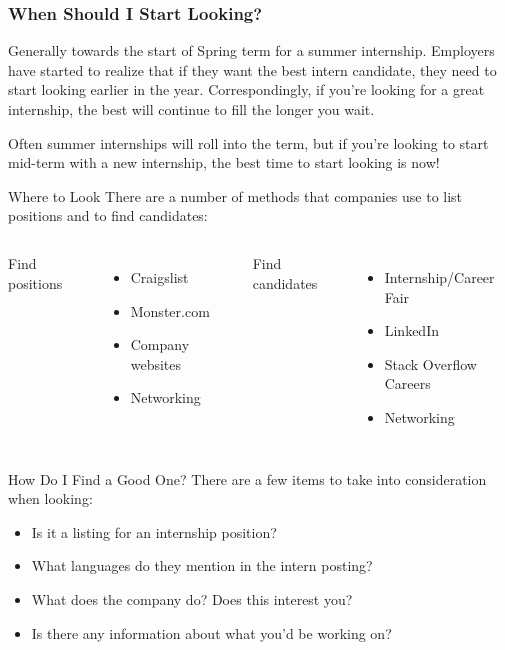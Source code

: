 \documentclass{beamer}
\begin{document}
\begin{frame}\frametitle{When Should I Start Looking?}

Generally towards the start of Spring term for a summer internship. Employers
have started to realize that if they want the best intern candidate, they need
to start looking earlier in the year. Correspondingly, if you're looking for a
great internship, the best will continue to fill the longer you wait.\\

\vfill

Often summer internships will roll into the term, but if you're looking to start
mid-term with a new internship, the best time to start looking is now!

\end{frame}


\begin{frame}{Where to Look}
  There are a number of methods that companies use to list positions and to
  find candidates: \\
  \vfill

  \begin{columns}[c]
      Find positions
      \begin{itemize}
        \item Craigslist
        \item Monster.com
        \item Company websites
        \item Networking
      \end{itemize}

      Find candidates
      \begin{itemize}
        \item Internship/Career Fair
        \item LinkedIn
        \item Stack Overflow Careers
        \item Networking
      \end{itemize}

  \end{columns}
\end{frame}



\begin{frame}{How Do I Find a Good One?}
  There are a few items to take into consideration when looking:
  \begin{itemize}
    \item Is it a listing for an internship position?
    \item What languages do they mention in the intern posting?
    \item What does the company do? Does this interest you?
    \item Is there any information about what you'd be working on?
  \end{itemize}
\end{frame}
\end{document}
